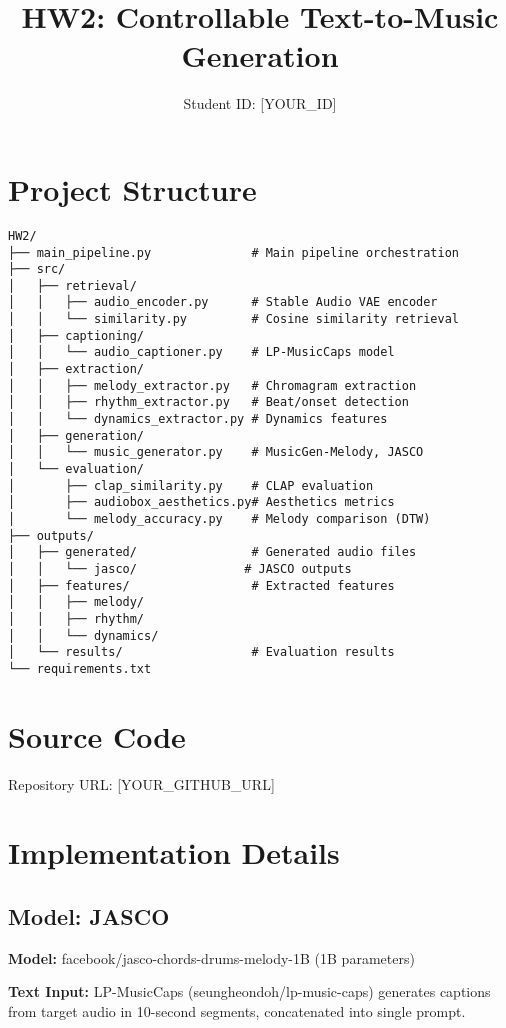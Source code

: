 \documentclass{article}
\title{HW2: Controllable Text-to-Music Generation}
\author{Student ID: [YOUR\_ID]}
\date{}
\begin{document}
\maketitle

\section{Project Structure}

\begin{verbatim}
HW2/
├── main_pipeline.py              # Main pipeline orchestration
├── src/
│   ├── retrieval/
│   │   ├── audio_encoder.py      # Stable Audio VAE encoder
│   │   └── similarity.py         # Cosine similarity retrieval
│   ├── captioning/
│   │   └── audio_captioner.py    # LP-MusicCaps model
│   ├── extraction/
│   │   ├── melody_extractor.py   # Chromagram extraction
│   │   ├── rhythm_extractor.py   # Beat/onset detection
│   │   └── dynamics_extractor.py # Dynamics features
│   ├── generation/
│   │   └── music_generator.py    # MusicGen-Melody, JASCO
│   └── evaluation/
│       ├── clap_similarity.py    # CLAP evaluation
│       ├── audiobox_aesthetics.py# Aesthetics metrics
│       └── melody_accuracy.py    # Melody comparison (DTW)
├── outputs/
│   ├── generated/                # Generated audio files
│   │   └── jasco/               # JASCO outputs
│   ├── features/                 # Extracted features
│   │   ├── melody/
│   │   ├── rhythm/
│   │   └── dynamics/
│   └── results/                  # Evaluation results
└── requirements.txt
\end{verbatim}

\section{Source Code}

Repository URL: [YOUR\_GITHUB\_URL]

\section{Implementation Details}

\subsection{Model: JASCO}

\textbf{Model:} facebook/jasco-chords-drums-melody-1B (1B parameters)

\textbf{Text Input:} LP-MusicCaps (seungheondoh/lp-music-caps) generates captions from target audio in 10-second segments, concatenated into single prompt.
\end{document}
